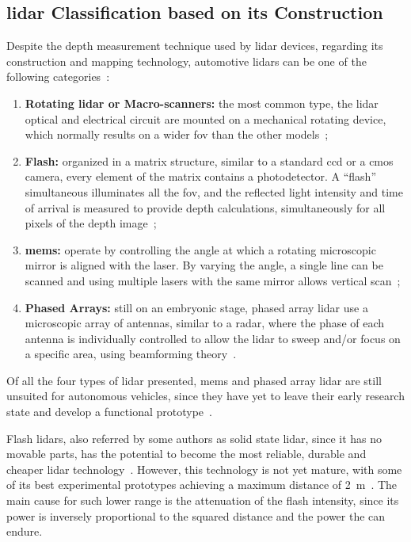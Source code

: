 \subsection{\acs{lidar} Classification based on its Construction}
Despite the depth measurement technique used by \ac{lidar} devices, regarding its construction and mapping technology, automotive \acp{lidar} can be one of the following categories~\cite{Hecht2018, Sullivan2016}:

\begin{enumerate}
	\item \textbf{Rotating \ac{lidar} or Macro-scanners:} the most common type, the \ac{lidar} optical and electrical circuit are mounted on a mechanical rotating device, which normally results on a wider \ac{fov} than the other models~\cite{Sullivan2016};
	\item \textbf{Flash:} organized in a matrix structure, similar to a standard \ac{ccd} or a \ac{cmos} camera, every element of the matrix contains a photodetector. A ``flash'' simultaneous illuminates all the \ac{fov}, and the reflected light intensity and time of arrival is measured to provide depth calculations, simultaneously for all pixels of the depth image~\cite{TetraVue, Ouster, Gelbart2002,Stettner2010, Simpson2019}; 
	\item \textbf{\ac{mems}:} operate by controlling the angle at which a rotating microscopic mirror is aligned with the \ac{laser}. By varying the angle, a single line can be scanned and using multiple \acp{laser} with the same mirror allows vertical scan~\cite{LeddarTech, Yoo2018};
	\item \textbf{Phased Arrays:} still on an embryonic stage, phased array \ac{lidar} use a microscopic array of antennas, similar to a \ac{radar}, where the phase of each antenna is individually controlled to allow the \ac{lidar} to sweep and/or focus on a specific area, using beamforming theory~\cite{Quanergy2018, Yu2016}.
\end{enumerate}

Of all the four types of \ac{lidar} presented, \ac{mems} and phased array \ac{lidar} are still unsuited for autonomous vehicles, since they have yet to leave their early research state and develop a functional prototype~\cite{Sullivan2016, Hecht2018}. 

Flash \acp{lidar}, also referred by some authors as solid state \ac{lidar}, since it has no movable parts, has the potential to become the most reliable, durable and cheaper \ac{lidar} technology~\cite{Sullivan2016, Hecht2018, Fersch2017a}. However, this technology is not yet mature, with some of its best experimental  prototypes achieving a maximum distance of \SI{2}{\meter}~\cite{Hecht2018}. The main cause for such lower range is the attenuation of the flash intensity, since its power is inversely proportional to the squared distance and the power the can endure.

